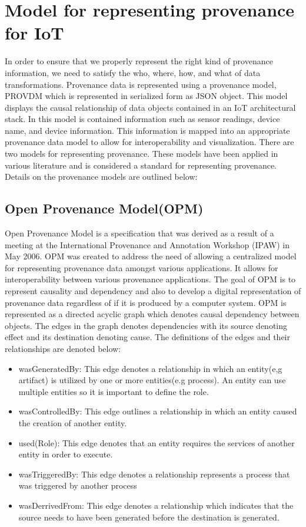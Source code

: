 \section{Model for representing provenance for IoT}

In order to ensure that we properly represent the right kind of provenance information, we need to satisfy the who, where, how, and what of data transformations. Provenance data is represented using a provenance model, PROV\-DM which is represented in serialized form as JSON object. This model displays the causal relationship of data objects contained in an IoT architectural stack. In this model is contained information such as sensor readings, device name, and device information. This information is mapped into an appropriate provenance data model to allow for interoperability and visualization. There are two models for representing provenance. These models \cite{prov_dm} have been applied in various literature and is considered a standard for representing provenance. Details on the provenance models are outlined below:

\subsection{Open Provenance Model(OPM)}

Open Provenance Model \cite{moreau_open_2011} is a specification that was derived as a result of a meeting at the International Provenance and Annotation Workshop (IPAW) in May 2006. OPM was created to address the need of allowing a centralized model for representing provenance data amongst various applications. It allows for interoperability between various provenance applications. The goal of OPM is to represent causality and dependency and also to develop a digital representation of provenance data regardless of if it is produced by a computer system. OPM is represented as a directed acyclic graph which denotes causal dependency between objects. The edges in the graph denotes dependencies with its source denoting effect and its destination denoting cause. The definitions of the edges and their relationships are denoted below: 

\begin{itemize}
\item wasGeneratedBy: This edge denotes a  relationship in which an entity(e,g artifact) is utilized by one or  more entities(e.g process). An entity can use multiple entities so it is important to define the role.  
\item wasControlledBy: This edge outlines a relationship in which an entity caused the creation of another entity.
\item used(Role): This edge denotes that an entity requires the services of another entity in order to execute.
\item wasTriggeredBy: This edge denotes a relationship represents a process that was triggered by another process
\item wasDerrivedFrom: This edge denotes a relationship which indicates that the source needs to have been generated before the destination is generated.
\end{itemize}

